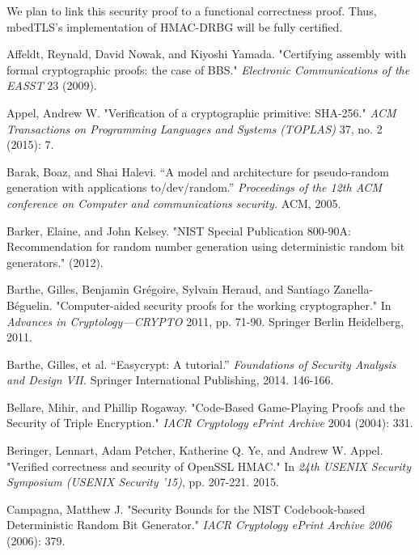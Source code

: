 \documentclass[12pt,lot, lof]{puthesis}
\begin{document}
{We plan to link this security proof to a functional correctness proof. Thus, mbedTLS's implementation of HMAC-DRBG will be fully certified.




\begin{thebibliography}{99}

Affeldt, Reynald, David Nowak, and Kiyoshi Yamada. "Certifying assembly with formal cryptographic proofs: the case of BBS." \emph{Electronic Communications of the EASST} 23 (2009).

Appel, Andrew W. "Verification of a cryptographic primitive: SHA-256." \emph{ACM Transactions on Programming Languages and Systems (TOPLAS)} 37, no. 2 (2015): 7.

Barak, Boaz, and Shai Halevi. ``A model and architecture for pseudo-random generation with applications to/dev/random.'' \emph{Proceedings of the 12th ACM conference on Computer and communications security.} ACM, 2005. 

Barker, Elaine, and John Kelsey. "NIST Special Publication 800-90A: Recommendation for random number generation using deterministic random bit generators." (2012).

Barthe, Gilles, Benjamin Gr{\'e}goire, Sylvain Heraud, and Santiago Zanella-B{\'e}guelin. "Computer-aided security proofs for the working cryptographer." In \emph{Advances in Cryptology---CRYPTO} 2011, pp. 71-90. Springer Berlin Heidelberg, 2011.

Barthe, Gilles, et al. ``Easycrypt: A tutorial.'' \emph{Foundations of Security Analysis and Design VII.} Springer International Publishing, 2014. 146-166.

Bellare, Mihir, and Phillip Rogaway. "Code-Based Game-Playing Proofs and the Security of Triple Encryption." \emph{IACR Cryptology ePrint Archive} 2004 (2004): 331.

Beringer, Lennart, Adam Petcher, Katherine Q. Ye, and Andrew W. Appel. "Verified correctness and security of OpenSSL HMAC." In \emph{24th USENIX Security Symposium (USENIX Security '15)}, pp. 207-221. 2015.

Campagna, Matthew J. "Security Bounds for the NIST Codebook-based Deterministic Random Bit Generator." \emph{IACR Cryptology ePrint Archive 2006} (2006): 379.


\end{thebibliography}}
\end{document}
